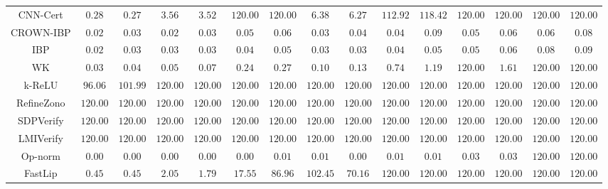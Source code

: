 \begin{table*}
{\begin{tabular}{c|c|c|c|c|c|c|c|c|c|c|c|c|c|c}
     CNN-Cert &        $0.28$ &        $0.27$ &        $3.56$ &        $3.52$ &      $120.00$ &      $120.00$ &        $6.38$ &        $6.27$ &      $112.92$ &      $118.42$ &      $120.00$ &      $120.00$ &      $120.00$ &      $120.00$ \\
    CROWN-IBP &        $0.02$ &        $0.03$ &        $0.02$ &        $0.03$ &        $0.05$ &        $0.06$ &        $0.03$ &        $0.04$ &        $0.04$ &        $0.09$ &        $0.05$ &        $0.06$ &        $0.06$ &        $0.08$ \\
          IBP &        $0.02$ &        $0.03$ &        $0.03$ &        $0.03$ &        $0.04$ &        $0.05$ &        $0.03$ &        $0.03$ &        $0.04$ &        $0.05$ &        $0.05$ &        $0.06$ &        $0.08$ &        $0.09$ \\
           WK &        $0.03$ &        $0.04$ &        $0.05$ &        $0.07$ &        $0.24$ &        $0.27$ &        $0.10$ &        $0.13$ &        $0.74$ &        $1.19$ &      $120.00$ &        $1.61$ &      $120.00$ &      $120.00$ \\
       k-ReLU &       $96.06$ &      $101.99$ &      $120.00$ &      $120.00$ &      $120.00$ &      $120.00$ &      $120.00$ &      $120.00$ &      $120.00$ &      $120.00$ &      $120.00$ &      $120.00$ &      $120.00$ &      $120.00$ \\
   RefineZono &      $120.00$ &      $120.00$ &      $120.00$ &      $120.00$ &      $120.00$ &      $120.00$ &      $120.00$ &      $120.00$ &      $120.00$ &      $120.00$ &      $120.00$ &      $120.00$ &      $120.00$ &      $120.00$ \\
    SDPVerify &      $120.00$ &      $120.00$ &      $120.00$ &      $120.00$ &      $120.00$ &      $120.00$ &      $120.00$ &      $120.00$ &      $120.00$ &      $120.00$ &      $120.00$ &      $120.00$ &      $120.00$ &      $120.00$ \\
    LMIVerify &      $120.00$ &      $120.00$ &      $120.00$ &      $120.00$ &      $120.00$ &      $120.00$ &      $120.00$ &      $120.00$ &      $120.00$ &      $120.00$ &      $120.00$ &      $120.00$ &      $120.00$ &      $120.00$ \\
      Op-norm &        $0.00$ &        $0.00$ &        $0.00$ &        $0.00$ &        $0.00$ &        $0.01$ &        $0.01$ &        $0.00$ &        $0.01$ &        $0.01$ &        $0.03$ &        $0.03$ &      $120.00$ &      $120.00$ \\
      FastLip &        $0.45$ &        $0.45$ &        $2.05$ &        $1.79$ &       $17.55$ &       $86.96$ &      $102.45$ &       $70.16$ &      $120.00$ &      $120.00$ &      $120.00$ &      $120.00$ &      $120.00$ &      $120.00$ \\

\end{tabular}}
\end{table*}
